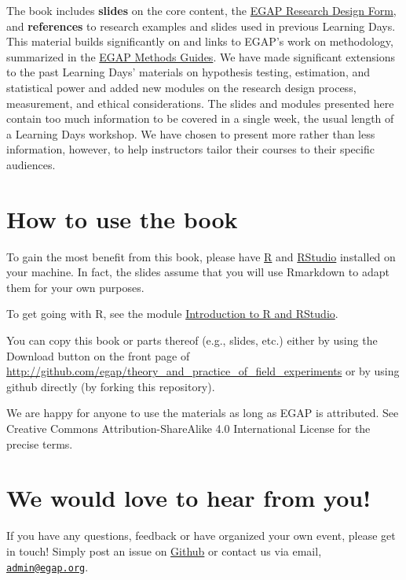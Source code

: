 \documentclass[12pt,]{book}
\begin{document}
The book includes \textbf{slides} on the core content, the \href{researchdesignform.html}{EGAP Research Design Form}, and \textbf{references} to research examples and slides used in previous Learning Days. This material builds significantly on and links to EGAP's work on methodology, summarized in the \href{https://egap.org/methods-guides/}{EGAP Methods Guides}. We have made significant extensions to the past Learning Days' materials on hypothesis testing, estimation, and statistical power and added new modules on the research design process, measurement, and ethical considerations. The slides and modules presented here contain too much information to be covered in a single week, the usual length of a Learning Days workshop. We have chosen to present more rather than less information, however, to help instructors tailor their courses to their specific audiences.

\hypertarget{how-to-use-the-book}{%
\section{How to use the book}\label{how-to-use-the-book}}

To gain the most benefit from this book, please have \href{https://cran.r-project.org/}{R} and \href{https://www.rstudio.com/products/rstudio/download/}{RStudio} installed on your machine. In fact, the slides assume that you will use Rmarkdown to adapt them for your own purposes.

To get going with R, see the module \href{introduction-to-r-and-rstudio.html}{Introduction to R and RStudio}.

You can copy this book or parts thereof (e.g., slides, etc.) either by using the Download button on the front page of \url{http://github.com/egap/theory_and_practice_of_field_experiments} or by using github directly (by forking this repository).

We are happy for anyone to use the materials as long as EGAP is attributed. See Creative Commons Attribution-ShareAlike 4.0 International License for the precise terms.

\hypertarget{we-would-love-to-hear-from-you}{%
\section{We would love to hear from you!}\label{we-would-love-to-hear-from-you}}

If you have any questions, feedback or have organized your own event, please get in touch! Simply post an issue on \href{https://github.com/egap/theory_and_practice_of_field_experiments/issues}{Github} or contact us via email, \href{mailto:admin@egap.org}{\nolinkurl{admin@egap.org}}.
\end{document}
